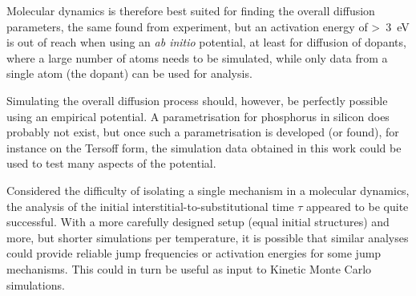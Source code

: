 \documentclass[11pt,bibliography=totoc,index=totoc]{scrbook}   %
\begin{document}
Molecular dynamics is therefore best suited for finding the overall diffusion parameters, the same found from experiment,
but an activation energy of >~3~eV is out of reach when using an \textit{ab initio} potential, at least for diffusion of dopants,
where a large number of atoms needs to be simulated, while only data from a single atom (the dopant) can be used for analysis.

Simulating the overall diffusion process should, however, be perfectly possible using an empirical potential.
A parametrisation for phosphorus in silicon does probably not exist, but once such a parametrisation is developed (or found), 
for instance on the Tersoff form, the simulation data obtained in this work could be used to test many aspects of the potential.

Considered the difficulty of isolating a single mechanism in a molecular dynamics, the analysis of 
the initial interstitial-to-substitutional time $\tau$ appeared to be quite successful. 
With a more carefully designed setup (equal initial structures) and more, but shorter simulations per temperature, 
it is possible that similar analyses could provide reliable jump frequencies or activation energies for 
some jump mechanisms. This could in turn be useful as input to Kinetic Monte Carlo simulations.









\end{document}
